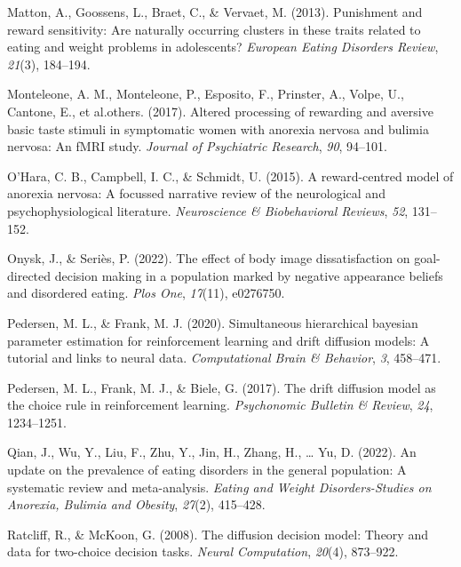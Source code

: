 \documentclass[
  man,floatsintext]{apa6}
\newlength{\cslhangindent}
\newlength{\cslentryspacingunit} %
\newenvironment{CSLReferences}[2] %
 {%
  \setlength{\parindent}{0pt}
  \ifodd #1
  \let\oldpar\par
  \def\par{\hangindent=\cslhangindent\oldpar}
  \fi
  \setlength{\parskip}{#2\cslentryspacingunit}
 }%
 {}
\begin{document}
\begin{CSLReferences}{1}{0}
\leavevmode{}%
Matton, A., Goossens, L., Braet, C., \& Vervaet, M. (2013). Punishment and reward sensitivity: Are naturally occurring clusters in these traits related to eating and weight problems in adolescents? \emph{European Eating Disorders Review}, \emph{21}(3), 184--194.

\leavevmode{}%
Monteleone, A. M., Monteleone, P., Esposito, F., Prinster, A., Volpe, U., Cantone, E., et al.others. (2017). Altered processing of rewarding and aversive basic taste stimuli in symptomatic women with anorexia nervosa and bulimia nervosa: An fMRI study. \emph{Journal of Psychiatric Research}, \emph{90}, 94--101.

\leavevmode{}%
O'Hara, C. B., Campbell, I. C., \& Schmidt, U. (2015). A reward-centred model of anorexia nervosa: A focussed narrative review of the neurological and psychophysiological literature. \emph{Neuroscience \& Biobehavioral Reviews}, \emph{52}, 131--152.

\leavevmode{}%
Onysk, J., \& Seriès, P. (2022). The effect of body image dissatisfaction on goal-directed decision making in a population marked by negative appearance beliefs and disordered eating. \emph{Plos One}, \emph{17}(11), e0276750.

\leavevmode{}%
Pedersen, M. L., \& Frank, M. J. (2020). Simultaneous hierarchical bayesian parameter estimation for reinforcement learning and drift diffusion models: A tutorial and links to neural data. \emph{Computational Brain \& Behavior}, \emph{3}, 458--471.

\leavevmode{}%
Pedersen, M. L., Frank, M. J., \& Biele, G. (2017). The drift diffusion model as the choice rule in reinforcement learning. \emph{Psychonomic Bulletin \& Review}, \emph{24}, 1234--1251.

\leavevmode{}%
Qian, J., Wu, Y., Liu, F., Zhu, Y., Jin, H., Zhang, H., \ldots{} Yu, D. (2022). An update on the prevalence of eating disorders in the general population: A systematic review and meta-analysis. \emph{Eating and Weight Disorders-Studies on Anorexia, Bulimia and Obesity}, \emph{27}(2), 415--428.

\leavevmode{}%
Ratcliff, R., \& McKoon, G. (2008). The diffusion decision model: Theory and data for two-choice decision tasks. \emph{Neural Computation}, \emph{20}(4), 873--922.


\end{CSLReferences}
\end{document}
